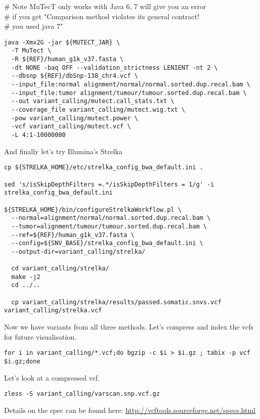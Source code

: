 \# Note MuTecT only works with Java 6, 7 will give you an error \\
\# if you get "Comparison method violates its general contract! \\
\# you used java 7"

\begin{lstlisting}
java -Xmx2G -jar ${MUTECT_JAR} \
  -T MuTect \
  -R ${REF}/human_g1k_v37.fasta \
  -dt NONE -baq OFF --validation_strictness LENIENT -nt 2 \
  --dbsnp ${REF}/dbSnp-138_chr4.vcf \
  --input_file:normal alignment/normal/normal.sorted.dup.recal.bam \
  --input_file:tumor alignment/tumour/tumour.sorted.dup.recal.bam \
  --out variant_calling/mutect.call_stats.txt \
  --coverage_file variant_calling/mutect.wig.txt \
  -pow variant_calling/mutect.power \
  -vcf variant_calling/mutect.vcf \
  -L 4:1-10000000
\end{lstlisting}

And finally let's try Illumina's Strelka

\begin{lstlisting}
cp ${STRELKA_HOME}/etc/strelka_config_bwa_default.ini .

sed 's/isSkipDepthFilters =.*/isSkipDepthFilters = 1/g' -i strelka_config_bwa_default.ini

${STRELKA_HOME}/bin/configureStrelkaWorkflow.pl \
  --normal=alignment/normal/normal.sorted.dup.recal.bam \
  --tumor=alignment/tumour/tumour.sorted.dup.recal.bam \
  --ref=${REF}/human_g1k_v37.fasta \
  --config=${SNV_BASE}/strelka_config_bwa_default.ini \
  --output-dir=variant_calling/strelka/

  cd variant_calling/strelka/
  make -j2
  cd ../..

  cp variant_calling/strelka/results/passed.somatic.snvs.vcf variant_calling/strelka.vcf
\end{lstlisting}

Now we have variants from all three methods. Let's compress and index the vcfs for future visualisation.

\begin{lstlisting}
for i in variant_calling/*.vcf;do bgzip -c $i > $i.gz ; tabix -p vcf $i.gz;done
\end{lstlisting}

Let's look at a compressed vcf.

\begin{lstlisting}
zless -S variant_calling/varscan.snp.vcf.gz
\end{lstlisting}

Details on the spec can be found here:
\url{http://vcftools.sourceforge.net/specs.html}

